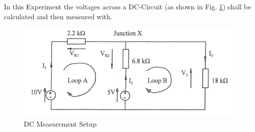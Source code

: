 %
%
%




In this Experiment the voltages across a DC-Circuit (as shown in Fig. \ref{fig:DC}) shall be calculated and then measured with.


\begin{figure}[H] %
\begin{center}
\includegraphics[width=1\linewidth]{LabOne/Exp1}
\end{center}
\caption{DC Measurement Setup}
\label{fig:DC}
\end{figure}



